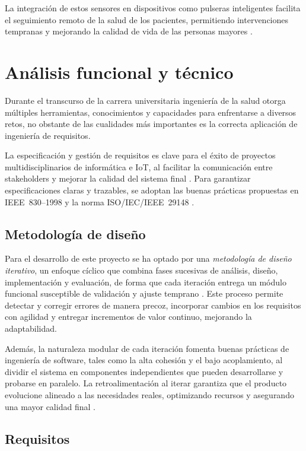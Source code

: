\documentclass[12pt, a4paper]{article}
\begin{document}
	La integración de estos sensores en dispositivos como pulseras inteligentes facilita el seguimiento remoto de la salud de los pacientes, permitiendo intervenciones tempranas y mejorando la calidad de vida de las personas mayores \cite{rodriguez2015}.


\section{Análisis funcional y técnico}
	
	Durante el transcurso de la carrera universitaria ingeniería de la salud otorga múltiples herramientas, conocimientos y capacidades para enfrentarse a diversos retos, no obstante de las cualidades más importantes es la correcta aplicación de ingeniería de requisitos.

	La especificación y gestión de requisitos es clave para el éxito de proyectos multidisciplinarios de informática e IoT, al facilitar la comunicación entre stakeholders y mejorar la calidad del sistema final \cite{wiegers, pohl}. Para garantizar especificaciones claras y trazables, se adoptan las buenas prácticas propuestas en IEEE 830–1998 y la norma ISO/IEC/IEEE 29148 \cite{ieee830, iso29148}.
	
		\subsection{Metodología de diseño}
		Para el desarrollo de este proyecto se ha optado por una \emph{metodología de diseño iterativo}, un enfoque cíclico que combina fases sucesivas de análisis, diseño, implementación y evaluación, de forma que cada iteración entrega un módulo funcional susceptible de validación y ajuste temprano \cite{wiegers,iso29148}. Este proceso permite detectar y corregir errores de manera precoz, incorporar cambios en los requisitos con agilidad y entregar incrementos de valor continuo, mejorando la adaptabilidad.
		
		Además, la naturaleza modular de cada iteración fomenta buenas prácticas de ingeniería de software, tales como la alta cohesión y el bajo acoplamiento, al dividir el sistema en componentes independientes que pueden desarrollarse y probarse en paralelo. La retroalimentación al iterar garantiza que el producto evolucione alineado a las necesidades reales, optimizando recursos y asegurando una mayor calidad final \cite{wiegers}.
	
		\subsection{Requisitos}
		
\end{document}
